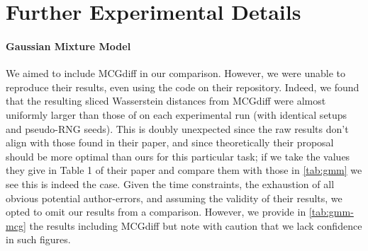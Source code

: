 \newpage

\section{Further Experimental Details} \label{sec:experimental-extra}

\paragraph{Gaussian Mixture Model} We aimed to include MCGdiff
\parencite{cardosoMonteCarloGuided2023} in our comparison. However, we were unable to reproduce
their results, even using the code on their repository. Indeed, we found that the resulting sliced
Wasserstein distances from MCGdiff were almost uniformly larger than those of
 on each experimental run (with identical setups and pseudo-RNG seeds). This
is doubly unexpected since the raw results don't align with those found in their paper,
and since theoretically their proposal should be more optimal than ours for this particular task;
if we take the values they give in Table 1 of their paper and compare them with those in
\autoref{tab:gmm} we see this is indeed the case. Given the time constraints, the exhaustion of all
obvious potential author-errors, and assuming the validity of their results, we opted to omit our
results from a comparison. However, we provide in \autoref{tab:gmm-mcg} the results including
MCGdiff but note with caution that we lack confidence in such figures.


